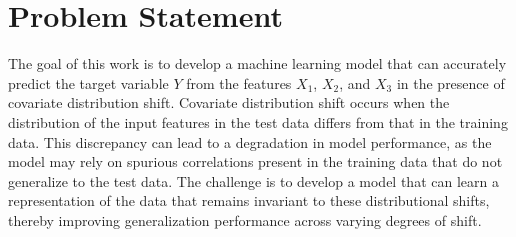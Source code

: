 \chapter*{Problem Statement}

\label{sec:problem_statement}
The goal of this work is to develop a machine learning model that can accurately predict the target variable $Y$ from the features $X_1$, $X_2$, and $X_3$ in the presence of covariate distribution shift. Covariate distribution shift occurs when the distribution of the input features in the test data differs from that in the training data. This discrepancy can lead to a degradation in model performance, as the model may rely on spurious correlations present in the training data that do not generalize to the test data. The challenge is to develop a model that can learn a representation of the data that remains invariant to these distributional shifts, thereby improving generalization performance across varying degrees of shift.